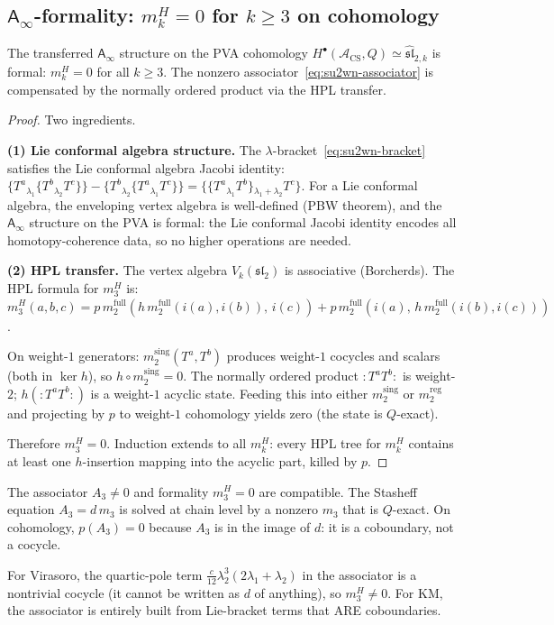 \documentclass[11pt]{article}
\newcommand{\cA}{\mathcal{A}}
\newcommand{\fsl}{\mathfrak{sl}}
\newcommand{\Ainf}{\mathsf{A}_{\infty}}
\newcommand{\normord}[1]{:\!#1\!:}
\begin{document}
\subsection{$\Ainf$-formality: $m_k^H = 0$ for $k \geq 3$ on cohomology}

\begin{theorem}[$\Ainf$-formality for $\widehat{\fsl}_2$]
\label{thm:su2wn-formality}
The transferred $\Ainf$ structure on the PVA cohomology
$H^\bullet(\cA_{\mathrm{CS}}, Q) \simeq \widehat{\fsl}_{2,k}$
is formal:
$m_k^H = 0$ for all $k \geq 3$.
The nonzero associator~\eqref{eq:su2wn-associator} is compensated
by the normally ordered product via the HPL transfer.
\end{theorem}

\begin{proof}
Two ingredients.

\medskip\noindent
\textbf{(1) Lie conformal algebra structure.}
The $\lambda$-bracket~\eqref{eq:su2wn-bracket} satisfies the
Lie conformal algebra Jacobi identity:
$\{T^a{}_{\lambda_1}\{T^b{}_{\lambda_2} T^c\}\}
- \{T^b{}_{\lambda_2}\{T^a{}_{\lambda_1} T^c\}\}
= \{\{T^a{}_{\lambda_1} T^b\}{}_{\lambda_1+\lambda_2} T^c\}$.
For a Lie conformal algebra, the enveloping vertex algebra is
well-defined (PBW theorem), and the $\Ainf$ structure on the
PVA is formal: the Lie conformal Jacobi identity encodes all
homotopy-coherence data, so no higher operations are needed.

\medskip\noindent
\textbf{(2) HPL transfer.}
The vertex algebra $V_k(\fsl_2)$ is associative (Borcherds).
The HPL formula for $m_3^H$ is:
$m_3^H(a,b,c) = p\, m_2^{\mathrm{full}}
(h\, m_2^{\mathrm{full}}(i(a), i(b)),\, i(c))
+ p\, m_2^{\mathrm{full}}
(i(a),\, h\, m_2^{\mathrm{full}}(i(b), i(c)))$.

On weight-$1$ generators: $m_2^{\mathrm{sing}}(T^a, T^b)$
produces weight-$1$ cocycles and scalars (both in $\ker h$),
so $h \circ m_2^{\mathrm{sing}} = 0$.  The normally ordered
product $\normord{T^a T^b}$ is weight-$2$; $h(\normord{T^a T^b})$
is a weight-$1$ acyclic state.  Feeding this into either
$m_2^{\mathrm{sing}}$ or $m_2^{\mathrm{reg}}$ and projecting
by $p$ to weight-$1$ cohomology yields zero (the state is
$Q$-exact).

Therefore $m_3^H = 0$.  Induction extends to all $m_k^H$:
every HPL tree for $m_k^H$ contains at least one $h$-insertion
mapping into the acyclic part, killed by $p$.
\end{proof}

\begin{remark}
The associator $A_3 \neq 0$ and formality $m_3^H = 0$ are
compatible.  The Stasheff equation $A_3 = d\, m_3$ is solved
at chain level by a nonzero $m_3$ that is $Q$-exact.
On cohomology, $p(A_3) = 0$ because $A_3$ is in the image
of $d$: it is a coboundary, not a cocycle.

For Virasoro, the quartic-pole term
$\tfrac{c}{12}\lambda_2^3(2\lambda_1+\lambda_2)$ in the
associator is a nontrivial cocycle (it cannot be written as
$d$ of anything), so $m_3^H \neq 0$.  For KM, the associator
is entirely built from Lie-bracket terms that ARE coboundaries.
\end{remark}
\end{document}
